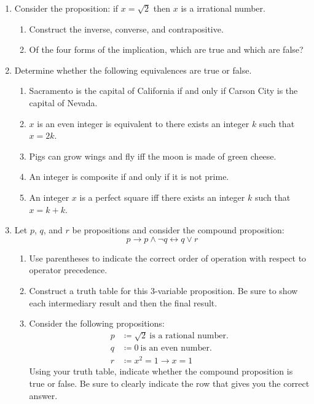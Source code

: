\documentclass[letterpaper,12pt,fleqn]{article}
\renewcommand{\implies}{\longrightarrow}
\renewcommand{\iff}{\longleftrightarrow}
\begin{document}
\begin{enumerate}[left=0in,itemsep=0.5in]
\item Consider the proposition: if \(x=\sqrt{2}\) then \(x\) is a irrational number.
  \begin{enumerate}
  \item Construct the inverse, converse, and contrapositive.
  \item Of the four forms of the implication, which are true and which are false?
  \end{enumerate}

\item Determine whether the following equivalences are true or false.
  \begin{enumerate}
  \item Sacramento is the capital of California if and only if Carson City is the capital of Nevada.
  \item \(x\) is an even integer is equivalent to there exists an integer \(k\) such that \(x=2k\).
  \item Pigs can grow wings and fly iff the moon is made of green cheese.
  \item An integer is composite if and only if it is not prime.
  \item An integer \(x\) is a perfect square iff there exists an integer \(k\) such that \(x=k+k\).
  \end{enumerate}

\item Let \(p\), \(q\), and \(r\)  be propositions and consider the compound proposition:
  \[p\implies p\land\lnot q\iff q\lor r\]
  \begin{enumerate}
    \item Use parentheses to indicate the correct order of operation with respect to operator precedence.
    \item Construct a truth table for this 3-variable proposition.  Be sure to show each intermediary result and then
      the final result.
    \item Consider the following propositions:
      \begin{align*}
        p &\coloneqq\sqrt{2}\ \text{is a rational number.} \\
        q &\coloneqq0\ \text{is an even number.} \\
        r &\coloneqq x^2=1\implies x=1
      \end{align*}
      Using your truth table, indicate whether the compound proposition is true or false.  Be sure to clearly
      indicate the row that gives you the correct answer.
  \end{enumerate}

\end{enumerate}
\end{document}
